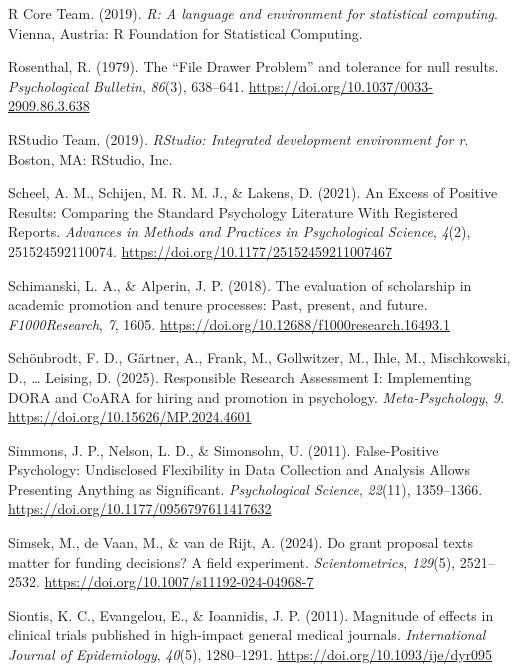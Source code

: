 \documentclass[
  british,
  a4paper,
  ,man,mask,floatsintext]{apa6}
\newlength{\cslhangindent}
\newenvironment{CSLReferences}[2] %
 {\begin{list}{}{%
  \setlength{\itemindent}{0pt}
  \setlength{\leftmargin}{0pt}
  \setlength{\parsep}{0pt}
  \ifodd #1
   \setlength{\leftmargin}{\cslhangindent}
   \setlength{\itemindent}{-1\cslhangindent}
  \fi
  \setlength{\itemsep}{#2\baselineskip}}}
 {\end{list}}
\begin{document}
\begin{CSLReferences}{1}{0}
R Core Team. (2019). \emph{R: {A} language and environment for statistical computing}. Vienna, Austria: R Foundation for Statistical Computing.

Rosenthal, R. (1979). The {``{File Drawer Problem}''} and tolerance for null results. \emph{Psychological Bulletin}, \emph{86}(3), 638--641. \url{https://doi.org/10.1037/0033-2909.86.3.638}

RStudio Team. (2019). \emph{{RStudio}: {Integrated} development environment for r}. Boston, MA: RStudio, Inc.

Scheel, A. M., Schijen, M. R. M. J., \& Lakens, D. (2021). An {Excess} of {Positive Results}: {Comparing} the {Standard Psychology Literature With Registered Reports}. \emph{Advances in Methods and Practices in Psychological Science}, \emph{4}(2), 251524592110074. \url{https://doi.org/10.1177/25152459211007467}

Schimanski, L. A., \& Alperin, J. P. (2018). The evaluation of scholarship in academic promotion and tenure processes: {Past}, present, and future. \emph{F1000Research}, \emph{7}, 1605. \url{https://doi.org/10.12688/f1000research.16493.1}

Schönbrodt, F. D., Gärtner, A., Frank, M., Gollwitzer, M., Ihle, M., Mischkowski, D., \ldots{} Leising, D. (2025). Responsible {Research Assessment I}: {Implementing DORA} and {CoARA} for hiring and promotion in psychology. \emph{Meta-Psychology}, \emph{9}. \url{https://doi.org/10.15626/MP.2024.4601}

Simmons, J. P., Nelson, L. D., \& Simonsohn, U. (2011). False-{Positive Psychology}: {Undisclosed Flexibility} in {Data Collection} and {Analysis Allows Presenting Anything} as {Significant}. \emph{Psychological Science}, \emph{22}(11), 1359--1366. \url{https://doi.org/10.1177/0956797611417632}

Simsek, M., de Vaan, M., \& van de Rijt, A. (2024). Do grant proposal texts matter for funding decisions? {A} field experiment. \emph{Scientometrics}, \emph{129}(5), 2521--2532. \url{https://doi.org/10.1007/s11192-024-04968-7}

Siontis, K. C., Evangelou, E., \& Ioannidis, J. P. (2011). Magnitude of effects in clinical trials published in high-impact general medical journals. \emph{International Journal of Epidemiology}, \emph{40}(5), 1280--1291. \url{https://doi.org/10.1093/ije/dyr095}


\end{CSLReferences}
\end{document}
